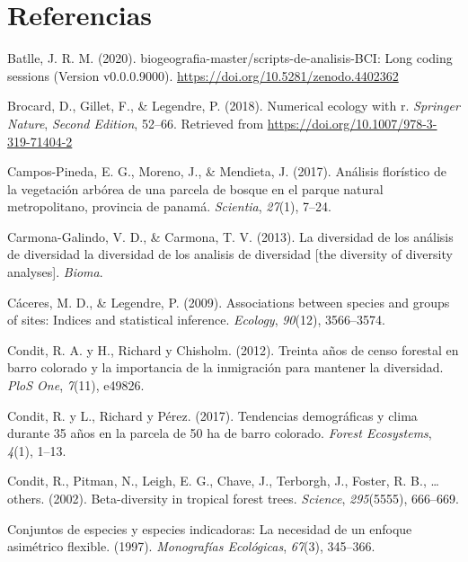 \documentclass[11pt,]{article}
\begin{document}
\section*{Referencias}\label{referencias}

\hypertarget{refs}{}
\hypertarget{ref-jose_ramon_martinez_batlle_2020_4402362}{}
Batlle, J. R. M. (2020). biogeografia-master/scripts-de-analisis-BCI:
Long coding sessions (Version v0.0.0.9000).
\url{https://doi.org/10.5281/zenodo.4402362}

\hypertarget{ref-brocard2011numerical}{}
Brocard, D., Gillet, F., \& Legendre, P. (2018). Numerical ecology with
r. \emph{Springer Nature}, \emph{Second Edition}, 52--66. Retrieved from
\url{https://doi.org/10.1007/978-3-319-71404-2}

\hypertarget{ref-campos2017analisis}{}
Campos-Pineda, E. G., Moreno, J., \& Mendieta, J. (2017). Análisis
florístico de la vegetación arbórea de una parcela de bosque en el
parque natural metropolitano, provincia de panamá. \emph{Scientia},
\emph{27}(1), 7--24.

\hypertarget{ref-carmona2013diversidad}{}
Carmona-Galindo, V. D., \& Carmona, T. V. (2013). La diversidad de los
análisis de diversidad la diversidad de los analisis de diversidad
{[}the diversity of diversity analyses{]}. \emph{Bioma}.

\hypertarget{ref-caceres2009associations}{}
Cáceres, M. D., \& Legendre, P. (2009). Associations between species and
groups of sites: Indices and statistical inference. \emph{Ecology},
\emph{90}(12), 3566--3574.

\hypertarget{ref-condit2012thirty}{}
Condit, R. A. y H., Richard y Chisholm. (2012). Treinta años de censo
forestal en barro colorado y la importancia de la inmigración para
mantener la diversidad. \emph{PloS One}, \emph{7}(11), e49826.

\hypertarget{ref-condit2017demographic}{}
Condit, R. y L., Richard y Pérez. (2017). Tendencias demográficas y
clima durante 35 años en la parcela de 50 ha de barro colorado.
\emph{Forest Ecosystems}, \emph{4}(1), 1--13.

\hypertarget{ref-condit2002beta}{}
Condit, R., Pitman, N., Leigh, E. G., Chave, J., Terborgh, J., Foster,
R. B., \ldots{} others. (2002). Beta-diversity in tropical forest trees.
\emph{Science}, \emph{295}(5555), 666--669.

\hypertarget{ref-dufrene1997species}{}
Conjuntos de especies y especies indicadoras: La necesidad de un enfoque
asimétrico flexible. (1997). \emph{Monografías Ecológicas},
\emph{67}(3), 345--366.
\end{document}
